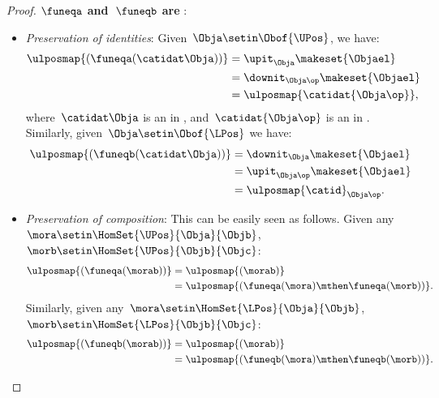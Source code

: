 \begin{proof}
    \textbf{$\funeqa$ and~$\funeqb$ are }:
    \begin{itemize}
        \item \emph{Preservation of identities}: Given~$\Obja\setin \Obof{\UPos}$, we have:
              \begin{equation}
                  \begin{aligned}
                      \ulposmap{(\funeqa(\catidat\Obja))} & =\upit_\Obja\makeset{\Objael} \\
                                                          & =\downit_{\Obja\op}\makeset{\Objael} \\
                                                          & =\ulposmap{\catidat{\Obja\op}},
                  \end{aligned}
              \end{equation}
              where~$\catidat\Obja$ is an  in \UPos, and~$\catidat{\Obja\op}$ is an  in \LPos.
              Similarly, given~$\Obja\setin \Obof{\LPos}$ we have:
              \begin{equation}
                  \begin{aligned}
                      \ulposmap{(\funeqb(\catidat\Obja))} & =\downit_\Obja\makeset{\Objael} \\
                                                          & =\upit_{\Obja\op}\makeset{\Objael} \\
                                                          & =\ulposmap{\catid}_{\Obja\op}.
                  \end{aligned}
              \end{equation}
        \item \emph{Preservation of composition}: This can be easily seen as follows.
              Given any~$\mora\setin \HomSet{\UPos}{\Obja}{\Objb}$,~$\morb\setin \HomSet{\UPos}{\Objb}{\Objc}$:
              \begin{equation}
                  \begin{aligned}
                      \ulposmap{(\funeqa(\morab))} & =\ulposmap{(\morab)} \\
                                                   & =\ulposmap{(\funeqa(\mora)\mthen \funeqa(\morb))}.
                  \end{aligned}
              \end{equation}
              Similarly, given any~$\mora\setin \HomSet{\LPos}{\Obja}{\Objb}$,~$\morb\setin \HomSet{\LPos}{\Objb}{\Objc}$:
              \begin{equation}
                  \begin{aligned}
                      \ulposmap{(\funeqb(\morab))} & =\ulposmap{(\morab)} \\
                                                   & =\ulposmap{(\funeqb(\mora)\mthen \funeqb(\morb))}.
                  \end{aligned}
              \end{equation}
    \end{itemize}


\end{proof}
